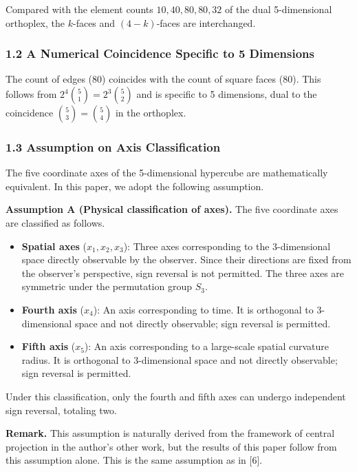 \documentclass[a4paper,11pt]{article}
\providecommand{\tightlist}{\setlength{\itemsep}{0pt}\setlength{\parskip}{0pt}}
\begin{document}
Compared with the element counts $10, 40, 80, 80, 32$ of the dual 5-dimensional orthoplex, the $k$-faces and $(4-k)$-faces are interchanged.

\subsubsection*{1.2 A Numerical Coincidence Specific to 5 Dimensions}

The count of edges (80) coincides with the count of square faces (80). This follows from $2^4 \binom{5}{1} = 2^3 \binom{5}{2}$ and is specific to 5 dimensions, dual to the coincidence $\binom{5}{3} = \binom{5}{4}$ in the orthoplex.

\subsubsection*{1.3 Assumption on Axis Classification}

The five coordinate axes of the 5-dimensional hypercube are mathematically equivalent. In this paper, we adopt the following assumption.

\textbf{Assumption A (Physical classification of axes).} The five coordinate axes are classified as follows.

\begin{itemize}
\tightlist
\item
  \textbf{Spatial axes} ($x_1, x_2, x_3$): Three axes corresponding to the 3-dimensional space directly observable by the observer. Since their directions are fixed from the observer's perspective, sign reversal is not permitted. The three axes are symmetric under the permutation group $S_3$.
\item
  \textbf{Fourth axis} ($x_4$): An axis corresponding to time. It is orthogonal to 3-dimensional space and not directly observable; sign reversal is permitted.
\item
  \textbf{Fifth axis} ($x_5$): An axis corresponding to a large-scale spatial curvature radius. It is orthogonal to 3-dimensional space and not directly observable; sign reversal is permitted.
\end{itemize}

Under this classification, only the fourth and fifth axes can undergo independent sign reversal, totaling two.

\textbf{Remark.} This assumption is naturally derived from the framework of central projection in the author's other work, but the results of this paper follow from this assumption alone. This is the same assumption as in [6].
\end{document}
